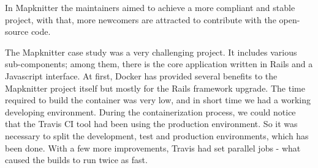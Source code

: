 \begin{table}[ht]
\caption{Mapknitter Comparative: Before DevOps and After DevOps.}
\label{table:mapknitter}
\end{table}

In Mapknitter the maintainers aimed to achieve a more compliant and stable
project, with that, more newcomers are attracted to contribute with the
open-source code.

The Mapknitter case study was a very challenging project. It includes various
sub-components; among them, there is the core application written in Rails and a
Javascript interface. At first, Docker has provided several benefits to the
Mapknitter project itself but mostly for the Rails framework upgrade. The time
required to build the container was very low, and in short time we had a working
developing environment. During the containerization process, we could notice
that the Travis CI tool had been using the production environment. So it was
necessary to split the development, test and production environments, which has
been done. With a few more improvements, Travis had set parallel jobs - what
caused the builds to run twice as fast.

